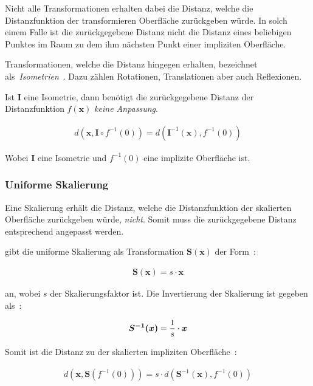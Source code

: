 Nicht alle Transformationen erhalten dabei die Distanz, welche die
Distanzfunktion der transformieren Oberfläche zurückgeben würde. In
solch einem Falle ist die zurückgegebene Distanz nicht die Distanz eines
beliebigen Punktes im Raum zu dem ihm nächsten Punkt einer impliziten
Oberfläche.

Transformationen, welche die Distanz hingegen erhalten,
bezeichnet~\citeauthor{hart_sphere_1994}
als~\textit{Isometrien}~\parencite[S. 534]{hart_sphere_1994}. Dazu
zählen Rotationen, Translationen aber auch Reflexionen.

Ist $\bm{I}$ eine Isometrie, dann benötigt die zurückgegebene Distanz der
Distanzfunktion $f(\bm{x})$ \textit{keine Anpassung}.

\begin{gather}
    d(\bm{x}, \bm{I} \circ f^{-1}(0)) = d(\bm{I}^{-1}(\bm{x}), f^{-1}(0))
\end{gather}

Wobei $\bm{I}$ eine Isometrie und $f^{-1}(0)$ eine implizite Oberfläche ist.

\subsubsection{Uniforme Skalierung}
\label{ssubsec:implicit_surfaces_ops_scaling}

Eine Skalierung erhält die Distanz, welche die Distanzfunktion der
skalierten Oberfläche zurückgeben würde, \textit{nicht}.  Somit muss die
zurückgegebene Distanz entsprechend angepasst werden.

\citeauthor{hart_sphere_1994} gibt die uniforme Skalierung als
Transformation $\bm{S(x)}$  der Form~\parencite[S. 534]{hart_sphere_1994}:

\begin{gather}
    \bm{S(x)} = s \cdot \bm{x}
\end{gather}

an, wobei $s$ der Skalierungsfaktor ist. Die Invertierung der Skalierung
ist gegeben als~\parencite[S. 534]{hart_sphere_1994}:

\begin{gather}
    \bm{S^{-1}(x)} = {1 \over s} \cdot \bm{x}
\end{gather}

Somit ist die Distanz zu der skalierten impliziten
Oberfläche~\parencite[S. 534]{hart_sphere_1994}:

\begin{gather}
    d(\bm{x}, \bm{S}(f^{-1}(0))) = s \cdot d(\bm{S}^{-1}(\bm{x}), f^{-1}(0))
\end{gather}


